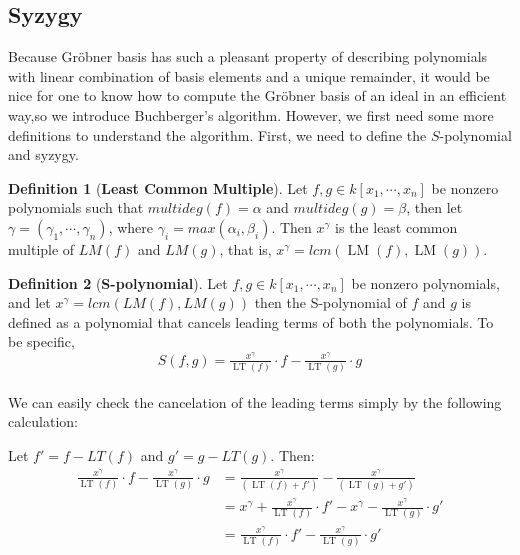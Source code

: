 \documentclass{article}
\newcommand{\lm}{\ensuremath{\operatorname{LM}}}
\newcommand{\lt}{\ensuremath{\operatorname{LT}}}
\theoremstyle{definition}
\newtheorem{definition}{Definition}[section]
\theoremstyle{remark}
\theoremstyle{example}
\begin{document}
\subsection{Syzygy}

Because Gröbner basis has such a pleasant property of describing polynomials with linear combination of basis elements and a unique remainder, it would be nice for one to know how to compute the Gröbner basis of an ideal in an efficient way,so we introduce Buchberger's algorithm. However, we first need some more definitions to understand the algorithm. First, we need to define the $S$-polynomial and syzygy.

\begin{definition}[\textbf{Least Common Multiple}]
    Let $f, g \in k[x_1, \cdots, x_n]$ be nonzero polynomials such that $multideg(f) = \alpha$ and $multideg(g) = \beta$, then let $\gamma = (\gamma_1, \cdots, \gamma_n)$, where $\gamma_i = max(\alpha_i,\beta_i)$. Then $x^{\gamma}$ is the least common multiple of $LM(f)$ and $LM(g)$, that is, $x^{\gamma} = lcm(\lm(f), \lm(g))$.
\end{definition}

\begin{definition}[\textbf{S-polynomial}]
    Let $f, g \in k[x_1, \cdots, x_n]$ be nonzero polynomials, and let $x^{\gamma} = lcm(LM(f), LM(g))$ then the S-polynomial of $f$ and $g$ is defined as a polynomial that cancels leading terms of both the polynomials. To be specific,
    \begin{equation}
        S(f,g) = \tfrac{x^{\gamma}}{\lt(f)} \cdot f - \tfrac{x^{\gamma}}{\lt(g)}\cdot g
    \end{equation}
\end{definition}

\paragraph{  }
We can easily check the cancelation of the leading terms simply by the following calculation:

Let $f' = f - LT(f)$ and $g' = g - LT(g)$. Then:
\begin{align}
    \tfrac{x^{\gamma}}{\lt(f)} \cdot f - \tfrac{x^{\gamma}}{\lt(g)} \cdot g &= \tfrac{x^{\gamma}}{(\lt(f) + f')} - \tfrac{x^{\gamma}}{(\lt(g) + g')}\\
    &= x^{\gamma} + \tfrac{x^{\gamma}}{\lt(f)} \cdot f' - x^{\gamma} - \tfrac{x^{\gamma}}{\lt(g)} \cdot g'\\
    &= \tfrac{x^{\gamma}}{\lt(f)} \cdot f' - \tfrac{x^{\gamma}}{\lt(g)} \cdot g' 
\end{align}
\end{document}
